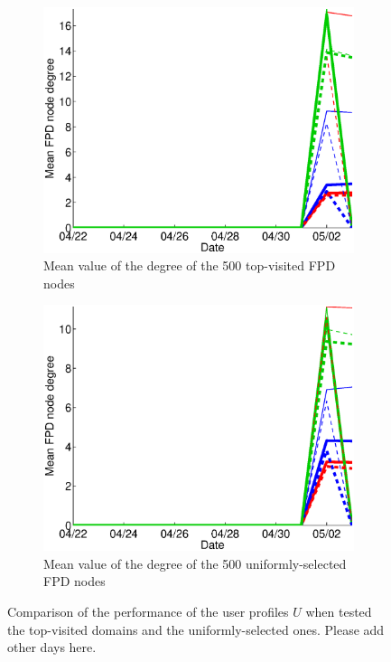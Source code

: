 \documentclass{sig-alternate}
\begin{document}
    \begin{figure}
   \centering

  \begin{subfigure}{.45\textwidth}
    \includegraphics[width=\textwidth]{figures/plots/top500-first-means.eps}
    \caption{Mean value of the degree of the 500 top-visited FPD nodes}
    \label{fig:top500_first_means}
  \end{subfigure}

  \begin{subfigure}{.45\textwidth}
    \includegraphics[width=\textwidth]{figures/plots/last500-first-means.eps}
    \caption{Mean value of the degree of the 500 uniformly-selected FPD nodes}
    \label{fig:top500_random_means}
  \end{subfigure}
  \caption{Comparison of the performance of the user profiles $U$ when tested the top-visited domains and the uniformly-selected ones. {\color{red}Please add other days here.}}
  \label{fig:top_last_domains_comparison}
  \end{figure}
\end{document}
